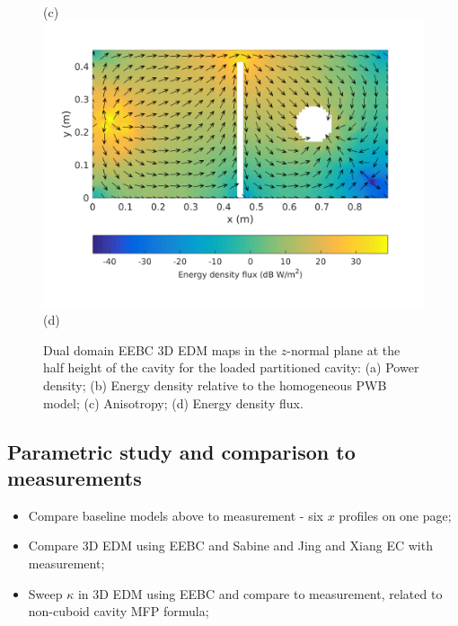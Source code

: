 \documentclass[a4paper]{article}
\numberwithin{equation}{section}
\begin{document}
\begin{figure}[ht]
\begin{center}
{\footnotesize (c)}\\
\vspace{2mm}
\includegraphics[trim={0 8mm 0 12mm},clip,width=0.52\linewidth]{figures/DDM-EEBC_3D_DL_EnergyDensityFluxMap}\\
{\footnotesize (d)}\\
\vspace{-2mm}
\caption{\label{fg:partcylddm_maps} Dual domain EEBC 3D EDM maps in the $z$-normal plane at the half height of the cavity for the 
loaded partitioned cavity: (a) Power density; (b) Energy density relative to the homogeneous PWB model;
(c) Anisotropy; (d) Energy density flux.}
\end{center}
\end{figure}

\subsection[Parametric study and comparison to measurements]{Parametric study and comparison to measurements}
\label{sc:res:para}

\begin{itemize}
 \item Compare baseline models above to measurement - six $x$ profiles on one page;
 \item Compare 3D EDM using EEBC and Sabine and Jing and Xiang EC with measurement;
 \item Sweep $\kappa$ in 3D EDM using EEBC and compare to measurement, related to non-cuboid cavity MFP formula; 
\end{itemize}
\end{document}
